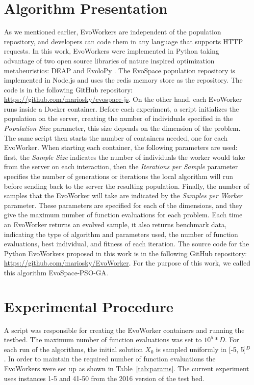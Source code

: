 \documentclass[sigconf]{acmart}
\begin{document}
\section{Algorithm Presentation}

As we mentioned earlier, EvoWorkers are independent of  the population
repository, and developers can code them  in any language that supports HTTP
requests. In this work,   EvoWorkers were implemented in Python taking
advantage of  two open source libraries of nature inspired optimization
metaheuristics:  DEAP \cite{fortin2012deap} and EvoloPy
\cite{faris2016evolopy}. The EvoSpace population repository is implemented in
Node.js and uses the redis memory store as the repository. The code is in the
following GitHub repository: \url{https://github.com/mariosky/evospace-js}. 
On the other hand, each EvoWorker runs inside a Docker container. Before each
experiment, a script initializes the population on the server, creating the
number of individuals specified in the {\em Population Size} parameter, this size
depends on the dimension of the problem.  The same script then starts the
number of containers needed, one for each EvoWorker. When starting each
container, the following parameters are used: first, the {\em Sample Size}
indicates the number of individuals the worker would take from the server on each
interaction, then the {\em Iterations per Sample} parameter specifies the number of
generations or iterations the local algorithm will run before sending back to
the server the resulting population. Finally, the number of samples that the
EvoWorker will take are indicated by the {\em Samples per Worker} parameter. These
parameters are specified for each of the dimensions, and they give the maximum
number of function evaluations for each problem. Each time an EvoWorker 
returns an evolved sample, it also returns benchmark data, indicating the type
of algorithm and parameters used, the number of function evaluations, 
best individual, and fitness of each iteration. The source code for the Python 
EvoWorkers proposed in this work is in the following GitHub repository:
\url{https://github.com/mariosky/EvoWorker}. 
For the purpose of this work, we called this algorithm EvoSpace-PSO-GA.   


% 
\section{Experimental Procedure} 
A script was responsible for creating the
EvoWorker  containers and running the testbed. The maximum number of  function
evaluations was set to $10^5*D$. For each run  of the algorithms, the initial
solution $X_0$ is sampled uniformly in [-5, 5]$^D$. In order to maintain the
required number of function  evaluations the EvoWorkers were set up as
shown in Table~\ref{tab:params}. The current experiment uses instances 1-5 and 41-50
from the 2016 version of the test bed. 
\end{document}
